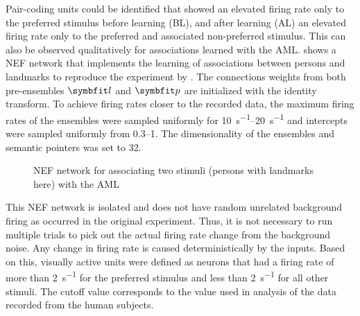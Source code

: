 Pair-coding units could be identified that showed an elevated firing rate only to the preferred stimulus before learning (BL), and after learning (AL) an elevated firing rate only to the preferred and associated non-preferred stimulus.
This can also be observed qualitatively for associations learned with the AML\@.
 shows a NEF network that implements the learning of associations between persons and landmarks to reproduce the experiment by \textcite{ison2015}.
The connections weights from both pre-ensembles $\vc l$ and $\vc p$ are initialized with the identity transform.
To achieve firing rates closer to the recorded data, the maximum firing rates of the ensembles were sampled uniformly for \SIrange{10}{20}{\second^{-1}} and intercepts were sampled uniformly from \numrange{0.3}{1}.
The dimensionality of the ensembles and semantic pointers was set to \num{32}.
\begin{figure}
    \centering
    \caption{NEF network for associating two stimuli (persons with landmarks here) with the AML}\label{fig:aml-net}
\end{figure}

This NEF network is isolated and does not have random unrelated background firing as occurred in the original experiment.
Thus, it is not necessary to run multiple trials to pick out the actual firing rate change from the background noise.
Any change in firing rate is caused deterministically by the inputs.
Based on this, visually active units were defined as neurons that had a firing rate of more than \SI{2}{\second^{-1}} for the preferred stimulus and less than \SI{2}{\second^{-1}} for all other stimuli.
The cutoff value corresponds to the value used in analysis of the data recorded from the human subjects.

